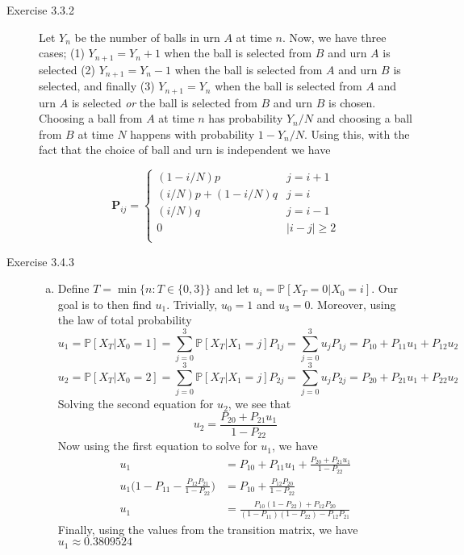 \documentclass[12pt]{article}  %
\newcommand{\prob}{{\mathbb{P}}}
\begin{document}
\begin{description}
\item[Exercise 3.3.2] Let $Y_n$ be the number of balls in urn $A$ at time $n$. Now, we have three cases; (1) $Y_{n+1} = Y_n + 1$ when the ball is selected from $B$ and urn $A$ is selected (2) $Y_{n+1} = Y_{n} - 1$ when the ball is selected from $A$ and urn $B$ is selected, and finally (3) $Y_{n+1} = Y_n$ when the ball is selected from $A$ and urn $A$ is selected \textit{or} the ball is selected from $B$ and urn $B$ is chosen. Choosing a ball from $A$ at time $n$ has probability $Y_n/N$ and choosing a ball from $B$ at time $N$ happens with probability $1 - Y_n/N$. Using this, with the fact that the choice of ball and urn is independent we have 

\[ \mathbf{P}_{ij} = \begin{cases}
(1 - i/N)p & j = i+1\\
(i/N)p + (1-i/N)q & j = i\\
(i/N)q & j = i-1\\
0 & |i-j|\geq 2\\
\end{cases}
\]
\item[Exercise 3.4.3] 
\begin{enumerate}[(a)]

\item Define $T = \min\{n: T\in \{0,3\}\}$ and let $u_i = \prob[X_T = 0|X_0 = i]$. Our goal is to then find $u_1$. Trivially, $u_0 = 1$ and $u_3 = 0$. Moreover, using the law of total probability 
$$u_1 = \prob[X_T|X_0 = 1] = \sum_{j= 0}^3 \prob[X_T|X_1 = j]P_{1j} = \sum_{j= 0}^3 u_jP_{1j} = P_{10} + P_{11}u_1 + P_{12}u_2$$
$$u_2 = \prob[X_T|X_0 = 2] = \sum_{j= 0}^3 \prob[X_T|X_1 = j]P_{2j} = \sum_{j= 0}^3 u_jP_{2j} = P_{20} + P_{21}u_1 + P_{22}u_2$$
Solving the second equation for $u_2$, we see that $$u_2 = \frac{P_{20} + P_{21}u_1}{1 - P_{22}}$$
Now using the first equation to solve for $u_1$, we have 
\begin{align*}
u_1 &= P_{10} + P_{11}u_1 + \frac{P_{20} + P_{21}u_1}{1 - P_{22}}\\
u_1\Big(1 - P_{11} - \frac{P_{12}P_{21}}{1-P_{22}}\Big) &= P_{10} + \frac{P_{12}P_{20}}{1-P_{22}}\\
u_1 &= \frac{P_{10}(1-P_{22})+P_{12}P_{20}}{(1-P_{11})(1-P_{22}) - P_{12}P_{21}}
\end{align*}
Finally, using the values from the transition matrix, we have $u_1\approx 0.3809524$


\end{enumerate}
\end{description}
\end{document}
